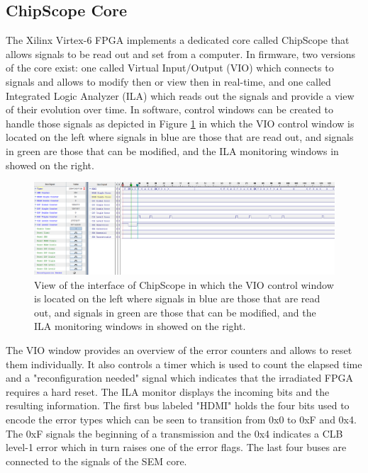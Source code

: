    \subsection{ChipScope Core}

      The Xilinx Virtex-6 FPGA implements a dedicated core called ChipScope that allows signals to be read out and set from a computer. In firmware, two versions of the core exist: one called Virtual Input/Output (VIO) which connects to signals and allows to modify then or view then in real-time, and one called Integrated Logic Analyzer (ILA) which reads out the signals and provide a view of their evolution over time. In software, control windows can be created to handle those signals as depicted in Figure \ref{fig:II-5-cs-clb} in which the VIO control window is located on the left where signals in blue are those that are read out, and signals in green are those that can be modified, and the ILA monitoring windows in showed on the right. \\

      \begin{figure}
        \centering
        \includegraphics[width=\textwidth]{img/II-5-irradiation/cs-clb.png}
        \caption{View of the interface of ChipScope in which the VIO control window is located on the left where signals in blue are those that are read out, and signals in green are those that can be modified, and the ILA monitoring windows in showed on the right.}
        \label{fig:II-5-cs-clb}
      \end{figure}

      The VIO window provides an overview of the error counters and allows to reset them individually. It also controls a timer which is used to count the elapsed time and a "reconfiguration needed" signal which indicates that the irradiated FPGA requires a hard reset. The ILA monitor displays the incoming bits and the resulting information. The first bus labeled "HDMI" holds the four bits used to encode the error types which can be seen to transition from 0x0 to 0xF and 0x4. The 0xF signals the beginning of a transmission and the 0x4 indicates a CLB level-1 error which in turn raises one of the error flags. The last four buses are connected to the signals of the SEM core.

